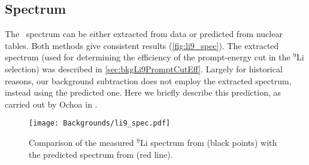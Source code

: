 \documentclass[../thesis.tex]{subfiles}
\begin{document}
\begin{comment}
- forming and fitting the histogram %
- - Detail the cuts we use for different muon energy ranges (prompt energy, neutron tag)
- Prompt cut efficiency
- - Extraction of spectrum. Subtraction of IBD spectrum.
- - Uncertainty
- - - Statistical - binomial confidence interval accounting for error bars on subtracted spectrum => 1-2\% (See if can find how Chris did it in code... sounds tricky)
- - - Systematic - Variations in time binning, muon PE cut in background sample => 1\%
- Neutron tag efficiency
- - Uncertainty - 45\% according to doc-10920
- - Nominal value of... 80\%? 60\%?
- Uncertainty from fit
- - Neutron tagging cutoff - 1.5e5 to 1.8e5 => 10\% (NOT IN CHRIS'S TABLE)
- - Binning => <5\% (NOT IN CHRIS'S TABLE) (MENTIONED AT END)
- - B12 => 8\%
- - He8 => 4\%
- Uncertainty of shower veto correction (He8 fraction)
- - Vary He8 fraction from 0 to 15\%
- Conversion from fit result to daily rate
- - Efficiencies of Li9 selection (ntag, pcut)
- - IBD selection efficiencies (veto, mult)
- - Shower veto correction
- - Propagation of uncertainties
\end{comment}

\subsection{Spectrum}
\label{sec:bkgLi9Spectrum}

The \LiHe\ spectrum can be either extracted from data or predicted from nuclear tables. Both methods give consistent results (\autoref{fig:li9_spec}). The extracted spectrum (used for determining the efficiency of the prompt-energy cut in the $^9$Li selection) was described in \autoref{sec:bkgLi9PromptCutEff}. Largely for historical reasons, our background subtraction does not employ the extracted spectrum, instead using the predicted one. Here we briefly describe this prediction, as carried out by Ochoa in \cite{pedroLi9Spec1,pedroLi9Spec2}.

\begin{figure}[h]
  \texttt{[image: Backgrounds/li9\_spec.pdf]}
  \caption{Comparison of the measured $^9$Li spectrum from \cite{ChrisLi9} (black points) with the predicted spectrum from \cite{pedroLi9Spec1,pedroLi9Spec2} (red line).}
  \label{fig:li9_spec}
\end{figure}
\end{document}
